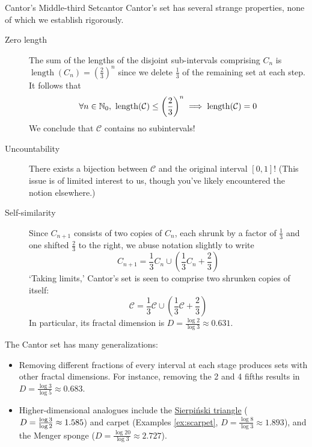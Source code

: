 \begin{example}{Cantor's Middle-third Set}{cantor}
	Cantor's set has several strange properties, none of which we establish rigorously.
	\begin{description}
	  \item[Zero length] The sum of the lengths of the disjoint sub-intervals comprising $C_n$ is $\operatorname{length}(C_n)=\left(\frac 23\right)^n$	since we delete $\frac 13$ of the remaining set at each step. It follows that
	  \[
	  	\forall n\in\mathbb{N}_0,\ \operatorname{length}(\mathcal C)\le \left(\frac 23\right)^n \implies \operatorname{length}(\mathcal C)=0
	  \]
	  We conclude that $\mathcal C$ contains no subintervals!
	  \item[Uncountability] There exists a bijection between $\mathcal C$ and the original interval $[0,1]$! (This issue is of limited interest to us, though you've likely encountered the notion elsewhere.)
	  \item[Self-similarity] Since $C_{n+1}$ consists of two copies of $C_n$, each shrunk by a factor of $\frac 13$ and one shifted $\frac 23$ to the right, we abuse notation slightly to write
		\[
			C_{n+1}=\frac 13C_n\cup\left(\frac 13C_n+\frac 23\right)
		\]
		`Taking limits,' Cantor's set is seen to comprise two shrunken copies of itself:
		\[
			\mathcal C=\frac 13\mathcal C\cup\left(\frac 13\mathcal C+\frac 23\right)
		\]
		In particular, its fractal dimension is $D=\frac{\log 2}{\log 3}\approx 0.631$.
	\end{description}

	The Cantor set has many generalizations:
	\begin{itemize}\itemsep0pt
	  \item Removing different fractions of every interval at each stage produces sets with other fractal dimensions. For instance, removing the 2\nd{} and 4\th{} fifths results in $D=\frac{\log 3}{\log 5}\approx 0.683$.
	  \item Higher-dimensional analogues include the \href{https://en.wikipedia.org/wiki/Sierpiński_triangle}{Sierpiński triangle} ($D=\smash{\frac{\log 3}{\log 2}}\approx 1.585$) and carpet (Examples \ref{ex:scarpet}, $D=\frac{\log 8}{\log 3}\approx 1.893$), and the Menger sponge ($D=\frac{\log 20}{\log 3}\approx 2.727$).
	\end{itemize}
\end{example}
\vspace{-5pt}



